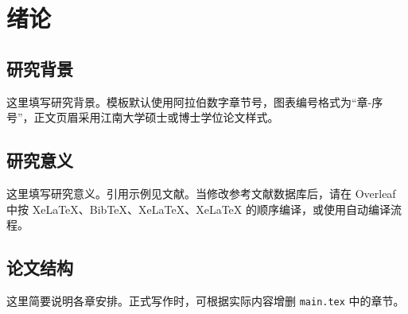 
\chapter{绪论}
\label{ch:introduction}

\section{研究背景}

这里填写研究背景。模板默认使用阿拉伯数字章节号，图表编号格式为“章-序号”，正文页眉采用江南大学硕士或博士学位论文样式。

\section{研究意义}

这里填写研究意义。引用示例见文献\cite{latexcompanion}。当修改参考文献数据库后，请在 Overleaf 中按 XeLaTeX、BibTeX、XeLaTeX、XeLaTeX 的顺序编译，或使用自动编译流程。

\section{论文结构}

这里简要说明各章安排。正式写作时，可根据实际内容增删 \texttt{main.tex} 中的章节。
